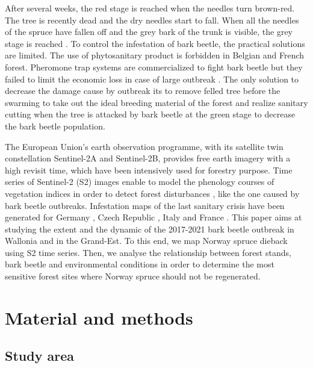 \documentclass[3p,procedia]{elsarticle}
\begin{document}
After several weeks, the red stage is reached when the needles turn brown-red. The tree is recently dead and the dry needles start to fall.
When all the needles of the spruce have fallen off and the grey bark of the trunk is visible, the grey stage is reached \citep{abdullah_european_2018}. 
To control the infestation of bark beetle, the practical solutions are limited. 
The use of phytosanitary product is forbidden in Belgian and French forest.
Pheromone trap systems are commercialized to fight bark beetle
 but they failed to limit the economic loss in case of large outbreak \citep{kuhn_pheromone_2022}.
The only solution to decrease the damage cause by outbreak its to remove felled tree before the swarming to take out the ideal breeding material of the forest and realize sanitary cutting when the tree is attacked by bark beetle at the green stage to decrease the bark beetle population. 

The European Union’s earth observation programme, with its satellite twin constellation Sentinel-2A and Sentinel-2B, provides free earth imagery with a high revisit time, which have been intensively used for forestry purpose. 
Time series of Sentinel-2 (S2) images enable to model the phenology courses of vegetation indices in order to detect forest disturbances \citep{low_phenology_2020}, like the one caused by bark beetle outbreaks.
Infestation maps of the last sanitary crisis have been generated for Germany \citep{ali_canopy_2021,thonfeld_first_2022}, Czech Republic \citep{barta_early_2021}, Italy \citep{dalponte_mapping_2022} and France \citep{nardi_drought_2022}. 
This paper aims at studying the extent and the dynamic of the 2017-2021 bark beetle outbreak in Wallonia and in the Grand-Est.
To this end, we map Norway spruce dieback using S2 time series.
Then, we analyse the relationship between forest stands, bark beetle and environmental conditions in order to determine the most sensitive forest sites where Norway spruce should not be regenerated.


\section{Material and methods}
\subsection{Study area}
\end{document}
